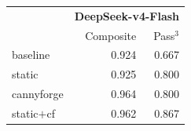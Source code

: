\begin{tabular}{lrr}
\toprule
 & \multicolumn{2}{c}{\textbf{DeepSeek-v4-Flash}} \\
 & Composite & Pass$^3$ \\
\midrule
baseline & 0.924 & 0.667 \\
static & 0.925 & 0.800 \\
cannyforge & 0.964 & 0.800 \\
static$+$cf & 0.962 & 0.867 \\
\bottomrule
\end{tabular}
